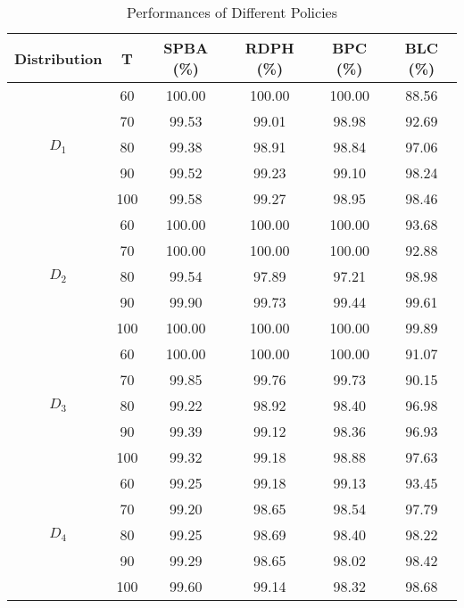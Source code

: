 \begin{table}[h]
    \centering
    \caption{Performances of Different Policies}\label{tab_perf}
    \begin{tabular}{cccccc}
    \hline
    Distribution & T & SPBA (\%) & RDPH (\%) & BPC (\%) & BLC (\%) \\
    \hline
    \multirow{5}{*}{$D_1$} & 60 & 100.00 & 100.00 & 100.00 & 88.56 \\
    & 70    & 99.53 & 99.01 & 98.98 & 92.69  \\
    & 80    & 99.38 & 98.91 & 98.84 & 97.06  \\
    & 90    & 99.52 & 99.23 & 99.10 & 98.24  \\
    & 100   & 99.58 & 99.27 & 98.95 & 98.46 \\
    \hline
    \multirow{5}{*}{$D_2$} & 60  & 100.00 & 100.00 & 100.00 & 93.68  \\
       & 70  & 100.00 & 100.00 & 100.00 & 92.88  \\
       & 80  & 99.54 & 97.89 & 97.21 & 98.98  \\
       & 90  & 99.90 & 99.73 & 99.44 & 99.61  \\
       & 100 & 100.00 & 100.00 & 100.00 & 99.89  \\ 
    \hline
    \multirow{5}{*}{$D_3$} & 60  & 100.00 & 100.00 & 100.00 & 91.07  \\
    & 70  & 99.85 & 99.76 & 99.73 & 90.15 \\
    & 80  & 99.22 & 98.92 & 98.40 & 96.98  \\
    & 90  & 99.39 & 99.12 & 98.36 & 96.93  \\
    & 100  & 99.32 & 99.18 & 98.88 & 97.63  \\
      \hline
      \multirow{5}{*}{$D_4$} & 60  & 99.25 & 99.18 & 99.13 & 93.45  \\
       & 70  & 99.20 & 98.65 & 98.54 & 97.79  \\
       & 80  & 99.25 & 98.69 & 98.40 & 98.22 \\
       & 90  & 99.29 & 98.65 & 98.02 & 98.42  \\
       & 100 & 99.60 & 99.14 & 98.32 & 98.68 \\
    \hline
    \end{tabular}
  \end{table}


